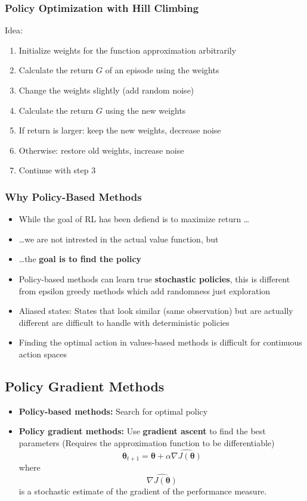 \subsubsection*{Policy Optimization with Hill Climbing}
Idea:
\begin{enumerate}
    \item Initialize weights for the function approximation arbitrarily
    \item Calculate the return \(G\) of an episode using the weights
    \item Change the weights slightly (add random noise)
    \item Calculate the return \(G\) using the new weights
    \item If return is larger: keep the new weights, decrease noise
    \item Otherwise: restore old weights, increase noise
    \item Continue with step 3
\end{enumerate}

\subsubsection{Why Policy-Based Methods}
\begin{itemize}
    \item While the goal of RL has been defiend is to maximize return \dots
    \item \dots we are not intrested in the actual value function, but
    \item \dots the \textbf{goal is to find the policy}
    \item Policy-based methods can learn true \textbf{stochastic policies}, this is different from epsilon greedy methods which add randomness just exploration
    \item Aliased states: States that look similar (same observation) but are actually different are difficult to handle with deterministic policies
    \item Finding the optimal action in values-based methods is difficult for continuous action spaces
\end{itemize}

\subsection{Policy Gradient Methods}
\begin{itemize}
    \item \textbf{Policy-based methods:} Search for optimal policy
    \item \textbf{Policy gradient methods:} Use \textbf{gradient ascent} to find the best parameters (Requires the approximation function to be differentiable)
    \[
    \boldsymbol{\theta}_{t+1} = \boldsymbol{\theta} + \alpha \widehat{\nabla J(\boldsymbol{\theta})}
    \]
    where
    \[
    \widehat{\nabla J(\boldsymbol{\theta})}
    \]
    is a stochastic estimate of the gradient of the performance measure.
\end{itemize}

